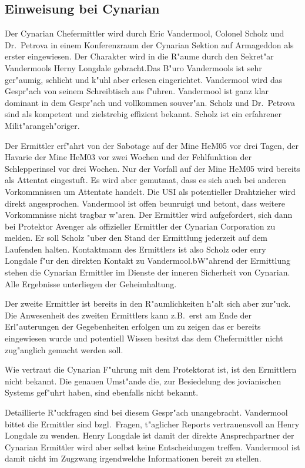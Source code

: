 \subsection{Einweisung bei Cynarian}

Der Cynarian Chefermittler wird durch Eric Vandermool, Colonel Scholz und Dr.~Petrova in einem Konferenzraum der Cynarian Sektion auf Armageddon als erster eingewiesen. Der Charakter wird in die R"aume durch den Sekret"ar Vandermools Herny Longdale gebracht.Das B"uro Vandermools ist sehr ger"aumig, schlicht und k"uhl aber erlesen eingerichtet. Vandermool wird das Gespr"ach von seinem Schreibtisch aus f"uhren. Vandermool ist ganz klar dominant in dem Gespr"ach und vollkommen souver"an. Scholz und Dr.~Petrova sind als kompetent und zielstrebig effizient bekannt. Scholz ist ein erfahrener Milit"arangeh"origer.

Der Ermittler erf"ahrt von der Sabotage auf der Mine HeM05 vor drei Tagen, der Havarie der Mine HeM03 vor zwei Wochen und der Fehlfunktion der Schlepperinsel vor drei Wochen. Nur der Vorfall auf der Mine HeM05 wird bereits als Attentat eingestuft. Es wird aber gemutma\3t, dass es sich auch bei anderen Vorkommnissen um Attentate handelt. Die USI als potentieller Drahtzieher wird direkt angesprochen. Vandermool ist offen beunruigt und betont, dass weitere Vorkommnisse nicht tragbar w"aren. Der Ermittler wird aufgefordert, sich dann bei Protektor Avenger als offizieller Ermittler der Cynarian Corporation zu melden. Er soll Scholz "uber den Stand der Ermittlung jederzeit auf dem Laufenden halten. Kontaktmann des Ermittlers ist also Scholz oder enry Longdale f"ur den direkten Kontakt zu Vandermool.bW"ahrend der Ermittlung stehen die Cynarian Ermittler im Dienste der inneren Sicherheit von Cynarian. Alle Ergebnisse unterliegen der Geheimhaltung.

Der zweite Ermittler ist bereits in den R"aumlichkeiten h"alt sich aber zur"uck. Die Anwesenheit des zweiten Ermittlers kann z.B.~erst am Ende der Erl"auterungen der Gegebenheiten erfolgen um zu zeigen das er bereits eingewiesen wurde und potentiell Wissen besitzt das dem Chefermittler nicht zug"anglich gemacht werden soll.


\begin{remarks}	
	Wie vertraut die Cynarian F"uhrung mit dem Protektorat ist, ist den Ermittlern nicht bekannt. Die genauen Umst"ande die, zur Besiedelung des jovianischen Systems gef"uhrt haben, sind ebenfalls nicht bekannt.
	
	Detaillierte R"uckfragen sind bei diesem Gespr"ach unangebracht. Vandermool bittet die Ermittler sind bzgl.~Fragen, t"aglicher Reports vertrauensvoll an Henry Longdale zu wenden. Henry Longdale ist damit der direkte Ansprechpartner der Cynarian Ermittler wird aber selbst keine Entscheidungen treffen. Vandermool ist damit nicht im Zugzwang irgendwelche Informationen bereit zu stellen.
\end{remarks}

